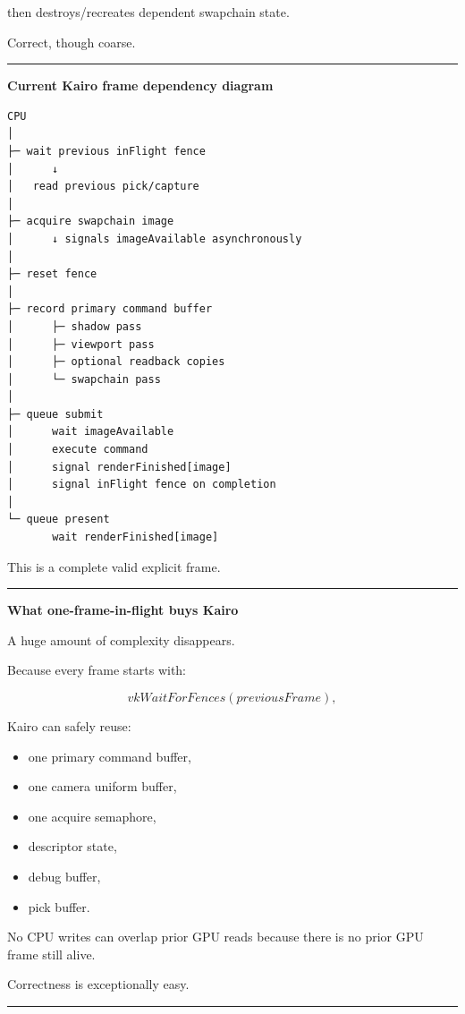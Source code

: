 then destroys/recreates dependent swapchain state.

Correct, though coarse.

\begin{center}\rule{0.5\linewidth}{0.5pt}\end{center}

\textbf{Current Kairo frame dependency diagram}

\begin{verbatim}
CPU
│
├─ wait previous inFlight fence
│      ↓
│   read previous pick/capture
│
├─ acquire swapchain image
│      ↓ signals imageAvailable asynchronously
│
├─ reset fence
│
├─ record primary command buffer
│      ├─ shadow pass
│      ├─ viewport pass
│      ├─ optional readback copies
│      └─ swapchain pass
│
├─ queue submit
│      wait imageAvailable
│      execute command
│      signal renderFinished[image]
│      signal inFlight fence on completion
│
└─ queue present
       wait renderFinished[image]
\end{verbatim}

This is a complete valid explicit frame.

\begin{center}\rule{0.5\linewidth}{0.5pt}\end{center}

\textbf{What one-frame-in-flight buys Kairo}

A huge amount of complexity disappears.

Because every frame starts with:

\[
vkWaitForFences(previousFrame),
\]

Kairo can safely reuse:

\begin{itemize}
\tightlist
\item
  one primary command buffer,
\item
  one camera uniform buffer,
\item
  one acquire semaphore,
\item
  descriptor state,
\item
  debug buffer,
\item
  pick buffer.
\end{itemize}

No CPU writes can overlap prior GPU reads because there is no prior GPU frame still alive.

Correctness is exceptionally easy.

\begin{center}\rule{0.5\linewidth}{0.5pt}\end{center}

